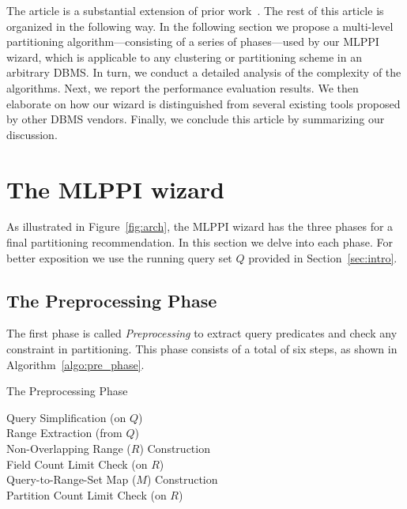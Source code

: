 \documentclass[runningheads]{comsis2}
\begin{document}
The article is a substantial extension of prior work~\cite{Suh12}. 
The rest of this article is \hbox{organized} in the following way. 
In the following section we propose a \hbox{multi-level} partitioning algorithm---consisting of a series of phases---used by our MLPPI wizard, 
which is applicable to any clustering or partitioning scheme in an arbitrary DBMS. 
In turn, we conduct a detailed analysis of the complexity of the algorithms. 
Next, we report the performance evaluation results. 
We then elaborate on how our wizard is distinguished from several existing tools proposed by other DBMS vendors. 
Finally, we conclude this article by summarizing our discussion.

\section{The MLPPI wizard}
\label{sec:algorithms}

As illustrated in Figure~\ref{fig:arch}, 
the MLPPI wizard has the three phases for a final partitioning recommendation. 
In this section we delve into each phase. For better exposition we use the running 
query set $Q$ \hbox{provided} in Section~\ref{sec:intro}.

\subsection{The Preprocessing Phase}
\label{sec:pre_phase}

The first phase is called {\em Preprocessing} 
to extract query predicates and check any constraint in partitioning. 
This phase consists of a total of six steps, as shown in Algorithm~\ref{algo:pre_phase}. 


\begin{algorithm}	
\caption{The Preprocessing Phase}
\label{algo:pre_phase}
{
\hspace{.05in} Query Simplification (on $Q$)\\
\hspace{.05in} Range Extraction (from $Q$) \\
\hspace{.05in} Non-Overlapping Range ($R$) Construction \\
\hspace{.05in} Field Count Limit Check (on $R$) \\
\hspace{.05in} Query-to-Range-Set Map ($M$) Construction \\
\hspace{.05in} Partition Count Limit Check (on $R$) \\
}
\end{algorithm}
\end{document}

